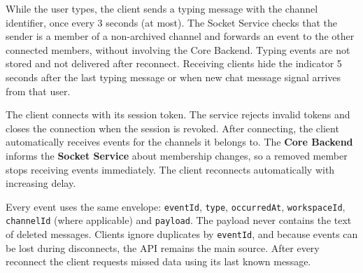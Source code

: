 \documentclass[
    english, %
]{VUMIFPSkursinis}
\begin{document}
While the user types, the client sends a typing message with the channel identifier, once every 3 seconds (at most). The Socket Service checks that the sender is a member of a non-archived channel and forwards an event to the other connected members, without involving the Core Backend. Typing events are not stored and not delivered after reconnect. Receiving clients hide the indicator 5 seconds after the last typing message or when new chat message signal arrives from that user.

The client connects with its session token. The service rejects invalid tokens and closes the connection when the session is revoked. After connecting, the client automatically receives events for the channels it belongs to. The \textbf{Core Backend} informs the \textbf{Socket Service} about membership changes, so a removed member stops receiving events immediately. The client reconnects automatically with increasing delay.

Every event uses the same envelope: \texttt{eventId}, \texttt{type}, \texttt{occurredAt}, \texttt{workspaceId}, \texttt{channelId} (where applicable) and \texttt{payload}. The payload never contains the text of deleted messages. Clients ignore duplicates by \texttt{eventId}, and because events can be lost during disconnects, the API remains the main source. After every reconnect the client requests missed data using its last known message.
\end{document}
